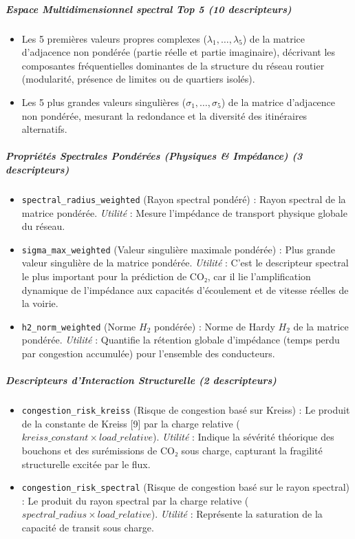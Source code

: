 \documentclass[10pt, a4paper]{article}
\providecommand{\tightlist}{}
\begin{document}
\subparagraph{Espace Multidimensionnel spectral Top 5 (10
descripteurs)}\label{espace-multidimensionnel-spectral-top-5-10-descripteurs}

\begin{itemize}
\tightlist
\item
  Les 5 premières valeurs propres complexes
  (\(\lambda_1, \dots, \lambda_5\)) de la matrice d'adjacence non
  pondérée (partie réelle et partie imaginaire), décrivant les
  composantes fréquentielles dominantes de la structure du réseau
  routier (modularité, présence de limites ou de quartiers isolés).
\item
  Les 5 plus grandes valeurs singulières (\(\sigma_1, \dots, \sigma_5\))
  de la matrice d'adjacence non pondérée, mesurant la redondance et la
  diversité des itinéraires alternatifs.
\end{itemize}

\subparagraph{Propriétés Spectrales Pondérées (Physiques \& Impédance)
(3
descripteurs)}\label{propriuxe9tuxe9s-spectrales-ponduxe9ruxe9es-physiques-impuxe9dance-3-descripteurs}

\begin{itemize}
\tightlist
\item
  \texttt{spectral\_radius\_weighted} (Rayon spectral pondéré) : Rayon
  spectral de la matrice pondérée. \emph{Utilité} : Mesure l'impédance
  de transport physique globale du réseau.
\item
  \texttt{sigma\_max\_weighted} (Valeur singulière maximale pondérée) :
  Plus grande valeur singulière de la matrice pondérée. \emph{Utilité} :
  C'est le descripteur spectral le plus important pour la prédiction de
  CO₂, car il lie l'amplification dynamique de l'impédance aux capacités
  d'écoulement et de vitesse réelles de la voirie.
\item
  \texttt{h2\_norm\_weighted} (Norme \(H_2\) pondérée) : Norme de Hardy
  \(H_2\) de la matrice pondérée. \emph{Utilité} : Quantifie la
  rétention globale d'impédance (temps perdu par congestion accumulée)
  pour l'ensemble des conducteurs.
\end{itemize}

\subparagraph{Descripteurs d'Interaction Structurelle (2
descripteurs)}\label{descripteurs-dinteraction-structurelle-2-descripteurs-1}

\begin{itemize}
\tightlist
\item
  \texttt{congestion\_risk\_kreiss} (Risque de congestion basé sur
  Kreiss) : Le produit de la constante de Kreiss {[}9{]} par la charge
  relative (\(kreiss\_constant \times load\_relative\)). \emph{Utilité}
  : Indique la sévérité théorique des bouchons et des surémissions de
  CO₂ sous charge, capturant la fragilité structurelle excitée par le
  flux.
\item
  \texttt{congestion\_risk\_spectral} (Risque de congestion basé sur le
  rayon spectral) : Le produit du rayon spectral par la charge relative
  (\(spectral\_radius \times load\_relative\)). \emph{Utilité} :
  Représente la saturation de la capacité de transit sous charge.
\end{itemize}
\end{document}
